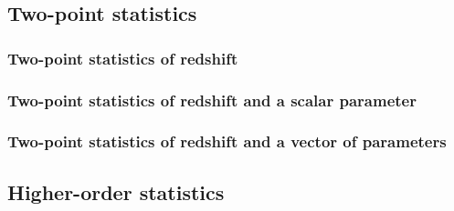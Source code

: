 \documentclass[12pt, onecolumn]{emulateapj}
\begin{document}
%
%

\subsection{Two-point statistics}
\subsubsection{Two-point statistics of redshift}

%
%
%

\subsubsection{Two-point statistics of redshift and a scalar parameter}
\subsubsection{Two-point statistics of redshift and a vector of parameters}
\subsection{Higher-order statistics}




\end{document}
